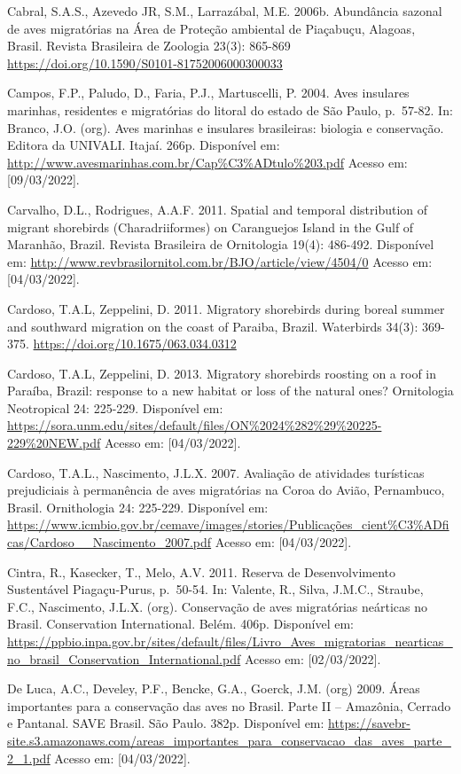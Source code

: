 \documentclass[
  oneside]{scrbook}
\begin{document}
Cabral, S.A.S., Azevedo JR, S.M., Larrazábal, M.E. 2006b. Abundância sazonal de aves migratórias na Área de Proteção ambiental de Piaçabuçu, Alagoas, Brasil. Revista Brasileira de Zoologia 23(3): 865-869 \url{https://doi.org/10.1590/S0101-81752006000300033}

Campos, F.P., Paludo, D., Faria, P.J., Martuscelli, P. 2004. Aves insulares marinhas, residentes e migratórias do litoral do estado de São Paulo, p.~57-82. In: Branco, J.O. (org). Aves marinhas e insulares brasileiras: biologia e conservação. Editora da UNIVALI. Itajaí. 266p. Disponível em: \url{http://www.avesmarinhas.com.br/Cap\%C3\%ADtulo\%203.pdf} Acesso em: {[}09/03/2022{]}.

Carvalho, D.L., Rodrigues, A.A.F. 2011. Spatial and temporal distribution of migrant shorebirds (Charadriiformes) on Caranguejos Island in the Gulf of Maranhão, Brazil. Revista Brasileira de Ornitologia 19(4): 486-492. Disponível em: \url{http://www.revbrasilornitol.com.br/BJO/article/view/4504/0} Acesso em: {[}04/03/2022{]}.

Cardoso, T.A.L, Zeppelini, D. 2011. Migratory shorebirds during boreal summer and southward migration on the coast of Paraiba, Brazil. Waterbirds 34(3): 369-375. \url{https://doi.org/10.1675/063.034.0312}

Cardoso, T.A.L, Zeppelini, D. 2013. Migratory shorebirds roosting on a roof in Paraíba, Brazil: response to a new habitat or loss of the natural ones? Ornitologia Neotropical 24: 225-229. Disponível em: \url{https://sora.unm.edu/sites/default/files/ON\%2024\%282\%29\%20225-229\%20NEW.pdf} Acesso em: {[}04/03/2022{]}.

Cardoso, T.A.L., Nascimento, J.L.X. 2007. Avaliação de atividades turísticas prejudiciais à permanência de aves migratórias na Coroa do Avião, Pernambuco, Brasil. Ornithologia 24: 225-229. Disponível em: \url{https://www.icmbio.gov.br/cemave/images/stories/Publicações_cient\%C3\%ADficas/Cardoso__Nascimento_2007.pdf} Acesso em: {[}04/03/2022{]}.

Cintra, R., Kasecker, T., Melo, A.V. 2011. Reserva de Desenvolvimento Sustentável Piagaçu-Purus, p.~50-54. In: Valente, R., Silva, J.M.C., Straube, F.C., Nascimento, J.L.X. (org). Conservação de aves migratórias neárticas no Brasil. Conservation International. Belém. 406p. Disponível em: \url{https://ppbio.inpa.gov.br/sites/default/files/Livro_Aves_migratorias_nearticas_no_brasil_Conservation_International.pdf} Acesso em: {[}02/03/2022{]}.

De Luca, A.C., Develey, P.F., Bencke, G.A., Goerck, J.M. (org) 2009. Áreas importantes para a conservação das aves no Brasil. Parte II -- Amazônia, Cerrado e Pantanal. SAVE Brasil. São Paulo. 382p. Disponível em: \url{https://savebr-site.s3.amazonaws.com/areas_importantes_para_conservacao_das_aves_parte_2_1.pdf} Acesso em: {[}04/03/2022{]}.
\end{document}

